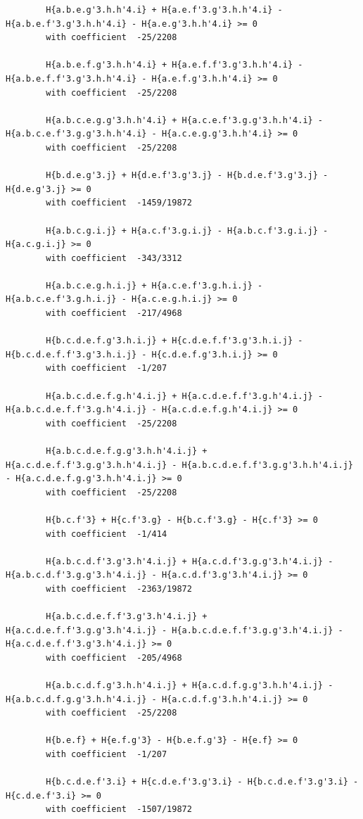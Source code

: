 \documentclass[11pt, a4paper]{kybernetika}
\begin{document}
\begin{verbatim}
		H{a.b.e.g'3.h.h'4.i} + H{a.e.f'3.g'3.h.h'4.i} - H{a.b.e.f'3.g'3.h.h'4.i} - H{a.e.g'3.h.h'4.i} >= 0
		with coefficient  -25/2208
		
		H{a.b.e.f.g'3.h.h'4.i} + H{a.e.f.f'3.g'3.h.h'4.i} - H{a.b.e.f.f'3.g'3.h.h'4.i} - H{a.e.f.g'3.h.h'4.i} >= 0
		with coefficient  -25/2208
		
		H{a.b.c.e.g.g'3.h.h'4.i} + H{a.c.e.f'3.g.g'3.h.h'4.i} - H{a.b.c.e.f'3.g.g'3.h.h'4.i} - H{a.c.e.g.g'3.h.h'4.i} >= 0
		with coefficient  -25/2208
		
		H{b.d.e.g'3.j} + H{d.e.f'3.g'3.j} - H{b.d.e.f'3.g'3.j} - H{d.e.g'3.j} >= 0
		with coefficient  -1459/19872
		
		H{a.b.c.g.i.j} + H{a.c.f'3.g.i.j} - H{a.b.c.f'3.g.i.j} - H{a.c.g.i.j} >= 0
		with coefficient  -343/3312
		
		H{a.b.c.e.g.h.i.j} + H{a.c.e.f'3.g.h.i.j} - H{a.b.c.e.f'3.g.h.i.j} - H{a.c.e.g.h.i.j} >= 0
		with coefficient  -217/4968
		
		H{b.c.d.e.f.g'3.h.i.j} + H{c.d.e.f.f'3.g'3.h.i.j} - H{b.c.d.e.f.f'3.g'3.h.i.j} - H{c.d.e.f.g'3.h.i.j} >= 0
		with coefficient  -1/207
		
		H{a.b.c.d.e.f.g.h'4.i.j} + H{a.c.d.e.f.f'3.g.h'4.i.j} - H{a.b.c.d.e.f.f'3.g.h'4.i.j} - H{a.c.d.e.f.g.h'4.i.j} >= 0
		with coefficient  -25/2208
		
		H{a.b.c.d.e.f.g.g'3.h.h'4.i.j} + H{a.c.d.e.f.f'3.g.g'3.h.h'4.i.j} - H{a.b.c.d.e.f.f'3.g.g'3.h.h'4.i.j} - H{a.c.d.e.f.g.g'3.h.h'4.i.j} >= 0
		with coefficient  -25/2208
		
		H{b.c.f'3} + H{c.f'3.g} - H{b.c.f'3.g} - H{c.f'3} >= 0
		with coefficient  -1/414
		
		H{a.b.c.d.f'3.g'3.h'4.i.j} + H{a.c.d.f'3.g.g'3.h'4.i.j} - H{a.b.c.d.f'3.g.g'3.h'4.i.j} - H{a.c.d.f'3.g'3.h'4.i.j} >= 0
		with coefficient  -2363/19872
		
		H{a.b.c.d.e.f.f'3.g'3.h'4.i.j} + H{a.c.d.e.f.f'3.g.g'3.h'4.i.j} - H{a.b.c.d.e.f.f'3.g.g'3.h'4.i.j} - H{a.c.d.e.f.f'3.g'3.h'4.i.j} >= 0
		with coefficient  -205/4968
		
		H{a.b.c.d.f.g'3.h.h'4.i.j} + H{a.c.d.f.g.g'3.h.h'4.i.j} - H{a.b.c.d.f.g.g'3.h.h'4.i.j} - H{a.c.d.f.g'3.h.h'4.i.j} >= 0
		with coefficient  -25/2208
		
		H{b.e.f} + H{e.f.g'3} - H{b.e.f.g'3} - H{e.f} >= 0
		with coefficient  -1/207
		
		H{b.c.d.e.f'3.i} + H{c.d.e.f'3.g'3.i} - H{b.c.d.e.f'3.g'3.i} - H{c.d.e.f'3.i} >= 0
		with coefficient  -1507/19872
		

\end{verbatim}
\end{document}
